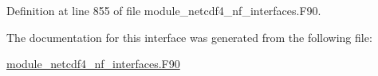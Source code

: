 Definition at line 855 of file module\+\_\+netcdf4\+\_\+nf\+\_\+interfaces.\+F90.



The documentation for this interface was generated from the following file\+:\begin{DoxyCompactItemize}
\item 
\hyperlink{module__netcdf4__nf__interfaces_8F90}{module\+\_\+netcdf4\+\_\+nf\+\_\+interfaces.\+F90}\end{DoxyCompactItemize}
